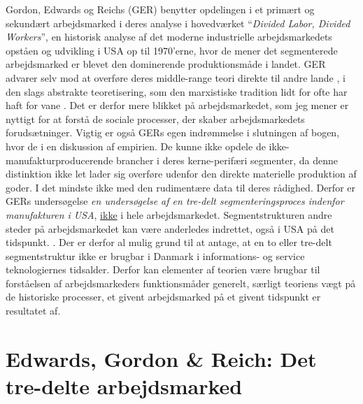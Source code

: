 
Gordon, Edwards og Reichs (GER) benytter opdelingen i et primært og sekundært arbejdsmarked i deres analyse i hovedværket “\emph{Divided Labor, Divided Workers}”, en historisk analyse af det moderne industrielle arbejdsmarkedets opståen og udvikling i USA op til 1970'erne, hvor de mener det segmenterede arbejdsmarked er blevet den dominerende produktionsmåde i landet. GER advarer selv mod at overføre deres middle-range teori direkte til andre lande , i den slags abstrakte teoretisering, som den marxistiske tradition lidt for ofte har haft for vane \parencite[21]{Gordon1982}. Det er derfor mere blikket på arbejdsmarkedet, som jeg mener er nyttigt for at forstå de sociale processer, der skaber arbejdsmarkedets forudsætninger. Vigtig er også GERs egen indrømmelse i slutningen af bogen, hvor de i en diskussion af empirien. De kunne ikke opdele de ikke-manufakturproducerende brancher i deres kerne-perifæri segmenter, da denne distinktion ikke let lader sig overføre udenfor den direkte materielle produktion af goder. I det mindste ikke med den rudimentære data til deres rådighed. Derfor er GERs undersøgelse \emph{en undersøgelse af en tre-delt segmenteringsproces indenfor manufakturen i USA}, \underline{ikke} i hele arbejdsmarkedet. Segmentstrukturen andre steder på arbejdsmarkedet kan være anderledes indrettet, også i USA på det tidspunkt. \parencite[199]{Gordon1982}. Der er derfor al mulig grund til at antage, at en to eller tre-delt segmentstruktur ikke er brugbar i Danmark i informations- og service teknologiernes tidsalder.  Derfor kan elementer af teorien være brugbar til forståelsen af arbejdsmarkeders funktionsmåder generelt, særligt teoriens vægt på de historiske processer, et givent arbejdsmarked på et givent tidspunkt er resultatet af.

\section{Edwards, Gordon \& Reich: Det tre-delte arbejdsmarked \label{AST_tredeltGER}}

